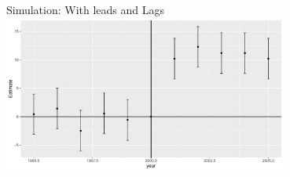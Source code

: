 \documentclass[
  ignorenonframetext,
]{beamer}
\begin{document}
\begin{frame}{Simulation: With leads and Lags}
\protect\hypertarget{simulation-with-leads-and-lags-7}{}
\includegraphics[width=0.7\textwidth,height=\textheight]{"Slides_DID_files/figure-beamer/didplotb-1.pdf"}
\end{frame}
\end{document}
